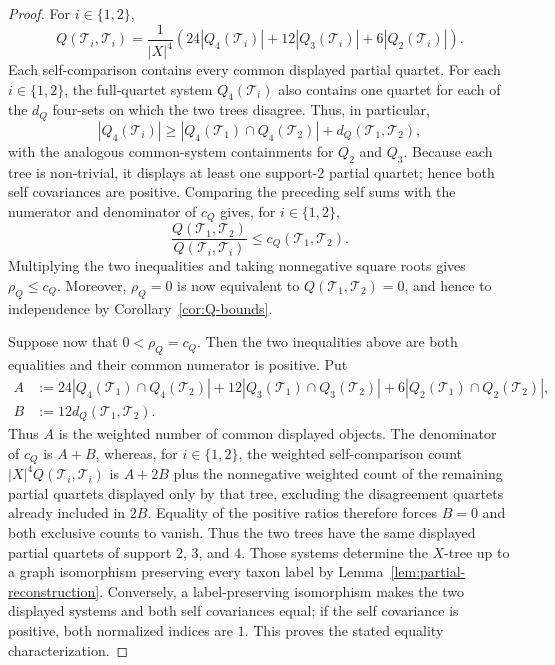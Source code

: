\documentclass[pdflatex,sn-mathphys-num]{sn-jnl}
\theoremstyle{thmstyleone}
\begin{document}
\begin{proof}
For $i\in\{1,2\}$,
\[
Q(\mathcal T_i,\mathcal T_i)=\frac1{|X|^4}
\left(24|Q_4(\mathcal T_i)|+12|Q_3(\mathcal T_i)|+6|Q_2(\mathcal T_i)|\right).
\]
Each self-comparison contains every common displayed partial quartet.  For
each $i\in\{1,2\}$, the full-quartet system $Q_4(\mathcal T_i)$ also contains
one quartet for each of the $d_Q$ four-sets on which the two trees disagree.
Thus, in particular,
\[
|Q_4(\mathcal T_i)|\ge
|Q_4(\mathcal T_1)\cap Q_4(\mathcal T_2)|+d_Q(\mathcal T_1,\mathcal T_2),
\]
with the analogous common-system containments for $Q_2$ and $Q_3$.
Because each tree is non-trivial, it displays at least one support-$2$ partial
quartet; hence both self covariances are positive.  Comparing the preceding
self sums with the numerator and
denominator of $c_Q$ gives, for $i\in\{1,2\}$,
\[
\frac{Q(\mathcal T_1,\mathcal T_2)}{Q(\mathcal T_i,\mathcal T_i)}
\le c_Q(\mathcal T_1,\mathcal T_2).
\]
Multiplying the two inequalities and taking nonnegative square roots gives
$\rho_Q\le c_Q$.  Moreover, $\rho_Q=0$ is now equivalent to
$Q(\mathcal T_1,\mathcal T_2)=0$, and
hence to independence by Corollary~\ref{cor:Q-bounds}.

Suppose now that $0<\rho_Q=c_Q$.  Then the two inequalities above are both
equalities and their common numerator is positive.  Put
\begin{align*}
A&:=24|Q_4(\mathcal T_1)\cap Q_4(\mathcal T_2)|
+12|Q_3(\mathcal T_1)\cap Q_3(\mathcal T_2)|
+6|Q_2(\mathcal T_1)\cap Q_2(\mathcal T_2)|,\\
B&:=12d_Q(\mathcal T_1,\mathcal T_2).
\end{align*}
Thus $A$ is the weighted number of common displayed objects.  The denominator
of $c_Q$ is $A+B$, whereas, for $i\in\{1,2\}$, the weighted self-comparison
count $|X|^4Q(\mathcal T_i,\mathcal T_i)$ is $A+2B$ plus the nonnegative weighted
count of the remaining partial quartets displayed only by that tree, excluding the
disagreement quartets already included in $2B$.  Equality of the positive
ratios therefore forces $B=0$ and both exclusive counts to vanish.  Thus the
two trees have the same displayed partial quartets of support $2$, $3$, and
$4$.  Those systems determine the $X$-tree up to a graph isomorphism
preserving every taxon label by Lemma~\ref{lem:partial-reconstruction}.
Conversely, a label-preserving isomorphism makes the two displayed systems and
both self covariances equal; if the self covariance is positive, both
normalized indices are $1$.  This proves the stated equality characterization.
\end{proof}
\end{document}
